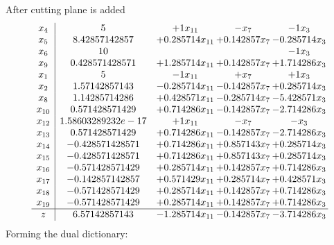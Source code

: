 \documentclass[11pt]{article}
\begin{document}
 After cutting plane is added 
\[\begin{array}{c| c c@{\hskip 2pt} c@{\hskip 2pt} c@{\hskip 2pt} }
 x_{4}   &  5 & + 1 x_{11} & - x_{7} & -1 x_{3}\\
 x_{5}   &  8.42857142857 & + 0.285714 x_{11} & + 0.142857 x_{7} & -0.285714 x_{3}\\
 x_{6}   &  10  &    &   & -1 x_{3}\\
 x_{9}   &  0.428571428571 & + 1.285714 x_{11} & + 0.142857 x_{7} & + 1.714286 x_{3}\\
 x_{1}   &  5 & -1 x_{11} & +  x_{7} & + 1 x_{3}\\
 x_{2}   &  1.57142857143 & -0.285714 x_{11} & -0.142857 x_{7} & + 0.285714 x_{3}\\
 x_{8}   &  1.14285714286 & + 0.428571 x_{11} & -0.285714 x_{7} & -5.428571 x_{3}\\
 x_{10}   &  0.571428571429 & + 0.714286 x_{11} & -0.142857 x_{7} & -2.714286 x_{3}\\
 x_{12}   &  1.58603289232e-17 & + 1 x_{11} & - x_{7} & - x_{3}\\
 x_{13}   &  0.571428571429 & + 0.714286 x_{11} & -0.142857 x_{7} & -2.714286 x_{3}\\
 x_{14}   &  -0.428571428571 & + 0.714286 x_{11} & + 0.857143 x_{7} & + 0.285714 x_{3}\\
 x_{15}   &  -0.428571428571 & + 0.714286 x_{11} & + 0.857143 x_{7} & + 0.285714 x_{3}\\
 x_{16}   &  -0.571428571429 & + 0.285714 x_{11} & + 0.142857 x_{7} & + 0.714286 x_{3}\\
 x_{17}   &  -0.142857142857 & + 0.571429 x_{11} & + 0.285714 x_{7} & + 0.428571 x_{3}\\
 x_{18}   &  -0.571428571429 & + 0.285714 x_{11} & + 0.142857 x_{7} & + 0.714286 x_{3}\\
 x_{19}   &  -0.571428571429 & + 0.285714 x_{11} & + 0.142857 x_{7} & + 0.714286 x_{3}\\
\hline
z    &  6.57142857143 & -1.285714 x_{11} & -0.142857 x_{7} & -3.714286 x_{3}\\
\end{array}\]
Forming the dual dictionary:
\end{document}
